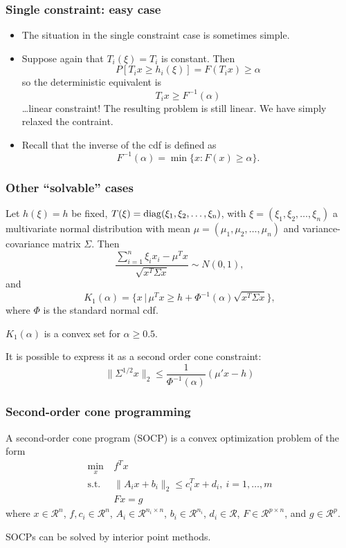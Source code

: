 \documentclass{beamer}
\def\cR{\mathcal{R}}
\begin{document}
\begin{frame}
\frametitle{Single constraint: easy case}

\begin{itemize}
	\item 
The situation in the single constraint case is sometimes simple.
\item 
Suppose again that $T_i (\xi) = T_i$ is constant. Then
\[
P[T_i x \geq h_i (\xi)] = F(T_i x) \geq \alpha
\]
so the deterministic equivalent is
\[
T_i x \geq F^{-1}(\alpha)
\]
\ldots linear constraint! The resulting problem is still linear. We have simply relaxed the contraint.
\item 
Recall that the inverse of the cdf is defined as
\[
F^{-1}(\alpha) = \min \lbrace x : F (x)  \geq \alpha \rbrace.
\]
\end{itemize}

\end{frame}

\begin{frame}
\frametitle{Other ``solvable'' cases}

Let $h(\xi) = h$ be fixed, $T(\xi) = \rm{diag}(\xi_1, \xi_2,\ldots, \xi_n)$, with $\xi = (\xi_1, \xi_2,\ldots, \xi_n)$ a multivariate normal distribution with mean $\mu = (\mu_1, \mu_2,\ldots,\mu_n)$ and variance-covariance matrix $\Sigma$.
Then
$$
\frac{\sum_{i = 1}^n \xi_i x_i - \mu^T x}{\sqrt{x^T\Sigma x}} \sim N(0,1),
$$
and
\[
K_1(\alpha) = \lbrace x \,|\, \mu^T x \geq h + \Phi^{-1}(\alpha) \sqrt{x^T\Sigma x} \rbrace,
\]
where $\Phi$ is the standard normal cdf.

\mbox{}

$K_1(\alpha)$ is a convex set for $\alpha \geq 0.5$.

\mbox{}

It is possible to express it as a second order cone constraint:
$$
\| \Sigma^{1/2} x \|_2 \leq \frac{1}{\Phi^{-1}(\alpha)} (\mu' x - h)
$$

\end{frame}

\begin{frame}
\frametitle{Second-order cone programming}

A second-order cone program (SOCP) is a convex optimization problem of the form
\begin{align*}
\min_x \ & f^T x \\
\mbox{s.t. } &
\| A_i x + b_i \|_2 \leq c_i^T x + d_i,\ i = 1,\ldots,m \\
& F x = g
\end{align*}
where $x \in \cR^n$, $f, c_i \in \cR^n$, $A_i \in \cR^{n_i \times n}$, $b_i \in \cR^{n_i}$, $d_i \in \cR$, $F \in \cR^{p \times n}$, and $g \in \cR^p$.

\mbox{}

SOCPs can be solved by interior point methods.

\end{frame}
\end{document}

